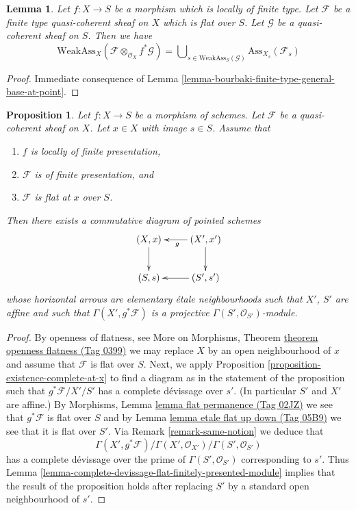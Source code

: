 \documentclass{amsart}
\theoremstyle{plain}
\newtheorem{proposition}[subsection]{Proposition}
\newtheorem{lemma}[subsection]{Lemma}
\theoremstyle{definition}
\theoremstyle{remark}
\numberwithin{equation}{subsection}
\begin{document}
\begin{lemma}
\label{lemma-bourbaki-finite-type-general-base}
Let $f : X \to S$ be a morphism which is locally of finite type.
Let $\mathcal{F}$ be a finite type quasi-coherent sheaf on $X$
which is flat over $S$. Let $\mathcal{G}$ be a quasi-coherent sheaf on $S$.
Then we have
$$
\text{WeakAss}_X(\mathcal{F} \otimes_{\mathcal{O}_X} f^*\mathcal{G}) =
\bigcup\nolimits_{s \in \text{WeakAss}_S(\mathcal{G})}
\text{Ass}_{X_s}(\mathcal{F}_s)
$$
\end{lemma}

\begin{proof}
Immediate consequence of
Lemma \ref{lemma-bourbaki-finite-type-general-base-at-point}.
\end{proof}


\begin{proposition}
\label{proposition-finite-presentation-flat-at-point}
Let $f : X \to S$ be a morphism of schemes.
Let $\mathcal{F}$ be a quasi-coherent sheaf on $X$.
Let $x \in X$ with image $s \in S$.
Assume that
\begin{enumerate}
\item $f$ is locally of finite presentation,
\item $\mathcal{F}$ is of finite presentation, and
\item $\mathcal{F}$ is flat at $x$ over $S$.
\end{enumerate}
Then there exists a commutative diagram of pointed schemes
$$
\xymatrix{
(X, x) \ar[d] & (X', x') \ar[l]^g \ar[d] \\
(S, s) & (S', s') \ar[l]
}
$$
whose horizontal arrows are elementary \'etale neighbourhoods
such that $X'$, $S'$ are affine and such that
$\Gamma(X', g^*\mathcal{F})$ is a projective
$\Gamma(S', \mathcal{O}_{S'})$-module.
\end{proposition}

\begin{proof}
By openness of flatness, see
More on Morphisms, Theorem \href{https://stacks.math.columbia.edu/tag/0399}{theorem openness flatness (Tag 0399)}
we may replace $X$ by an open neighbourhood of $x$ and assume that
$\mathcal{F}$ is flat over $S$. Next, we apply
Proposition \ref{proposition-existence-complete-at-x}
to find a diagram as in the statement of the proposition such
that $g^*\mathcal{F}/X'/S'$ has a complete d\'evissage over $s'$.
(In particular $S'$ and $X'$ are affine.) By
Morphisms, Lemma \href{https://stacks.math.columbia.edu/tag/02JZ}{lemma flat permanence (Tag 02JZ)}
we see that $g^*\mathcal{F}$ is flat over $S$ and by
Lemma \href{https://stacks.math.columbia.edu/tag/05B9}{lemma etale flat up down (Tag 05B9)}
we see that it is flat over $S'$. Via
Remark \ref{remark-same-notion}
we deduce that
$$
\Gamma(X', g^*\mathcal{F})/
\Gamma(X', \mathcal{O}_{X'})/
\Gamma(S', \mathcal{O}_{S'})
$$
has a complete d\'evissage over the prime of $\Gamma(S', \mathcal{O}_{S'})$
corresponding to $s'$. Thus
Lemma \ref{lemma-complete-devissage-flat-finitely-presented-module}
implies that the result of the proposition holds after replacing
$S'$ by a standard open neighbourhood of $s'$.
\end{proof}
\end{document}
